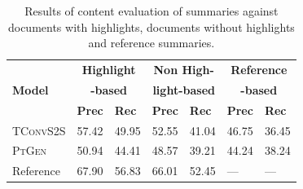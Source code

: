 \documentclass[11pt,a4paper]{article}
\newcommand\todo[1]{{\textcolor{red}{todo: #1}}}
\newcommand\ptgen{\textsc{PtGen}}
\newcommand\tconv{\textsc{TConvS2S}}
\begin{document}
\begin{table}[ht!]
\small
\begin{tabular}{l|p{0.4cm}p{0.6cm}|p{0.4cm}p{0.4cm}|p{0.4cm}p{0.4cm}}
\hline
\multirow{3}{*}{\textbf{Model}}                & \multicolumn{2}{c|}{\textbf{Highlight}}                              & \multicolumn{2}{c|}{\textbf{Non High-}} & 
\multicolumn{2}{c}{\textbf{Reference}}\\
\multirow{2}{*}{}                
& \multicolumn{2}{c|}{\textbf{-based}}                              & \multicolumn{2}{c|}{\textbf{light-based}} & 
\multicolumn{2}{c}{\textbf{-based}}\\
& \textbf{Prec} & \textbf{Rec} 
& \textbf{Prec} & \textbf{Rec}
& \textbf{Prec} & \textbf{Rec} \\ \hline
\tconv{} & 57.42 & 49.95 & 52.55 & 41.04 & 46.75 & 36.45             \\
\ptgen{} & 50.94 & 44.41 & 48.57 & 39.21  & 44.24 & 38.24             \\
Reference & 67.90 & 56.83 & 66.01 & 52.45  & --- & --- \\
\hline
\end{tabular}
\caption{Results of content evaluation of summaries against documents with highlights, documents without highlights and reference summaries.}
\label{table:summresult}
\end{table}
\end{document}
